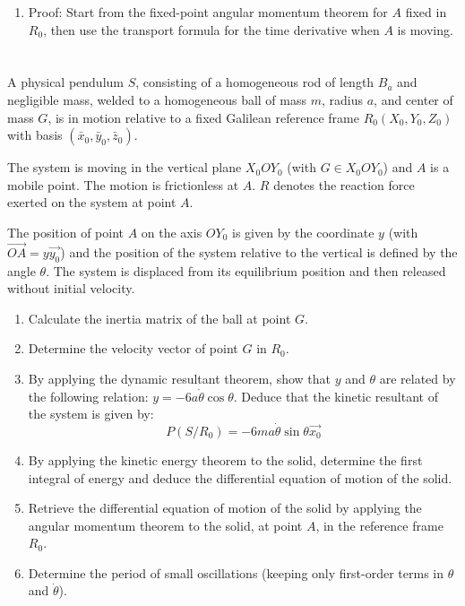 \documentclass[12pt]{article}
\begin{document}
\begin{answerbox}
\begin{enumerate}
\begin{enumerate}
          \item Proof: Start from the fixed-point angular momentum theorem for \(A\) fixed in \(R_0\), then use the transport formula for the time derivative when \(A\) is moving.
      \end{enumerate}
  \end{enumerate}
\end{answerbox}

\newpage
\section{}
A physical pendulum \(S\), consisting of a homogeneous rod of length \(B_a\) and negligible mass, welded to a homogeneous ball of mass \(m\), radius \(a\), and center of mass \(G\), is in motion relative to a fixed Galilean reference frame \(R_0(X_0, Y_0, Z_0)\) with basis \((\bar{x}_0, \bar{y}_0, \bar{z}_0)\).

The system is moving in the vertical plane \(X_0OY_0\) (with \(G \in X_0OY_0\)) and \(A\) is a mobile point. The motion is frictionless at \(A\).  
\(R\) denotes the reaction force exerted on the system at point \(A\).

The position of point \(A\) on the axis \(OY_0\) is given by the coordinate \(y\) (with \(\overrightarrow{OA} = y \overrightarrow{y_0}\)) and the position of the system relative to the vertical is defined by the angle \(\theta\). The system is displaced from its equilibrium position and then released without initial velocity.

\begin{enumerate}
    \item Calculate the inertia matrix of the ball at point \(G\).
    
    \item Determine the velocity vector of point \(G\) in \(R_0\).
    
    \item By applying the dynamic resultant theorem, show that \(y\) and \(\theta\) are related by the following relation: \(y = -6a \dot{\theta} \cos\theta\). Deduce that the kinetic resultant of the system is given by:
    \[
    P(S/R_0) = -6m a \dot{\theta} \sin\theta \overrightarrow{x_0}
    \]
    
    \item By applying the kinetic energy theorem to the solid, determine the first integral of energy and deduce the differential equation of motion of the solid.
    
    \item Retrieve the differential equation of motion of the solid by applying the angular momentum theorem to the solid, at point \(A\), in the reference frame \(R_0\).
    
    \item Determine the period of small oscillations (keeping only first-order terms in \(\theta\) and \(\dot{\theta}\)).
\end{enumerate}
\end{document}

